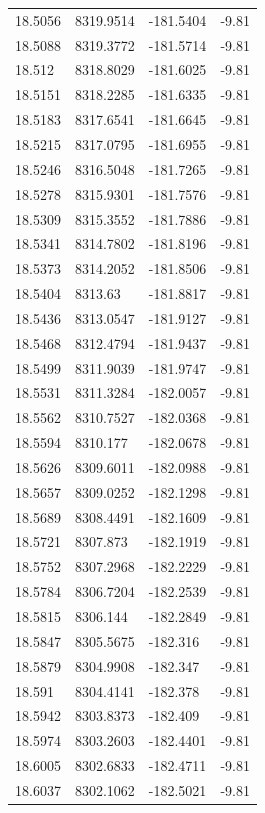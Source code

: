 \begin{table}[H]
\begin{tabular}{llll}
18.5056 & 8319.9514 & -181.5404 & -9.81 \\
18.5088 & 8319.3772 & -181.5714 & -9.81 \\
18.512 & 8318.8029 & -181.6025 & -9.81 \\
18.5151 & 8318.2285 & -181.6335 & -9.81 \\
18.5183 & 8317.6541 & -181.6645 & -9.81 \\
18.5215 & 8317.0795 & -181.6955 & -9.81 \\
18.5246 & 8316.5048 & -181.7265 & -9.81 \\
18.5278 & 8315.9301 & -181.7576 & -9.81 \\
18.5309 & 8315.3552 & -181.7886 & -9.81 \\
18.5341 & 8314.7802 & -181.8196 & -9.81 \\
18.5373 & 8314.2052 & -181.8506 & -9.81 \\
18.5404 & 8313.63 & -181.8817 & -9.81 \\
18.5436 & 8313.0547 & -181.9127 & -9.81 \\
18.5468 & 8312.4794 & -181.9437 & -9.81 \\
18.5499 & 8311.9039 & -181.9747 & -9.81 \\
18.5531 & 8311.3284 & -182.0057 & -9.81 \\
18.5562 & 8310.7527 & -182.0368 & -9.81 \\
18.5594 & 8310.177 & -182.0678 & -9.81 \\
18.5626 & 8309.6011 & -182.0988 & -9.81 \\
18.5657 & 8309.0252 & -182.1298 & -9.81 \\
18.5689 & 8308.4491 & -182.1609 & -9.81 \\
18.5721 & 8307.873 & -182.1919 & -9.81 \\
18.5752 & 8307.2968 & -182.2229 & -9.81 \\
18.5784 & 8306.7204 & -182.2539 & -9.81 \\
18.5815 & 8306.144 & -182.2849 & -9.81 \\
18.5847 & 8305.5675 & -182.316 & -9.81 \\
18.5879 & 8304.9908 & -182.347 & -9.81 \\
18.591 & 8304.4141 & -182.378 & -9.81 \\
18.5942 & 8303.8373 & -182.409 & -9.81 \\
18.5974 & 8303.2603 & -182.4401 & -9.81 \\
18.6005 & 8302.6833 & -182.4711 & -9.81 \\
18.6037 & 8302.1062 & -182.5021 & -9.81 \\

\end{tabular}
\end{table}
